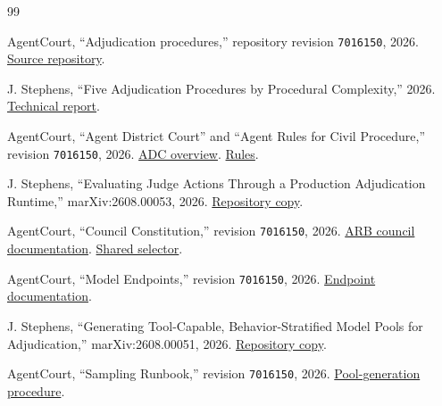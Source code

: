 \documentclass[11pt]{article}
\newcommand{\code}[1]{\texttt{#1}}
\begin{document}
\begingroup
\small
\setlength{\emergencystretch}{3em}
\begin{thebibliography}{99}
\raggedright

AgentCourt, ``Adjudication procedures,'' repository revision \code{7016150}, 2026.  \href{https://github.com/agentcourt/adj/tree/7016150f2ddc286e6079f1a99b616ac52d09057d}{Source repository}.

J. Stephens, ``Five Adjudication Procedures by Procedural Complexity,'' 2026.  \href{https://github.com/agentcourt/adj/blob/7016150f2ddc286e6079f1a99b616ac52d09057d/reports/marxiv/procedure-complexity/paper.pdf}{Technical report}.

AgentCourt, ``Agent District Court'' and ``Agent Rules for Civil Procedure,'' revision \code{7016150}, 2026.  \href{https://github.com/agentcourt/adj/blob/7016150f2ddc286e6079f1a99b616ac52d09057d/adc/README.md}{ADC overview}.  \href{https://github.com/agentcourt/adj/blob/7016150f2ddc286e6079f1a99b616ac52d09057d/adc/docs/ARCP.md}{Rules}.

J. Stephens, ``Evaluating Judge Actions Through a Production Adjudication Runtime,'' marXiv:2608.00053, 2026.  \href{https://github.com/agentcourt/adj/blob/7016150f2ddc286e6079f1a99b616ac52d09057d/reports/marxiv/evaluation-methods/paper.pdf}{Repository copy}.

AgentCourt, ``Council Constitution,'' revision \code{7016150}, 2026.  \href{https://github.com/agentcourt/adj/blob/7016150f2ddc286e6079f1a99b616ac52d09057d/arb/docs/councils.md}{ARB council documentation}.  \href{https://github.com/agentcourt/adj/blob/7016150f2ddc286e6079f1a99b616ac52d09057d/common/councilsample/selector.go}{Shared selector}.

AgentCourt, ``Model Endpoints,'' revision \code{7016150}, 2026.  \href{https://github.com/agentcourt/adj/blob/7016150f2ddc286e6079f1a99b616ac52d09057d/docs/model-endpoints.md}{Endpoint documentation}.

J. Stephens, ``Generating Tool-Capable, Behavior-Stratified Model Pools for Adjudication,'' marXiv:2608.00051, 2026.  \href{https://github.com/agentcourt/adj/blob/7016150f2ddc286e6079f1a99b616ac52d09057d/reports/marxiv/model-pool-generation/paper.pdf}{Repository copy}.

AgentCourt, ``Sampling Runbook,'' revision \code{7016150}, 2026.  \href{https://github.com/agentcourt/adj/blob/7016150f2ddc286e6079f1a99b616ac52d09057d/model-pool/docs/sampling-runbook.md}{Pool-generation procedure}.


\end{thebibliography}
\end{document}
